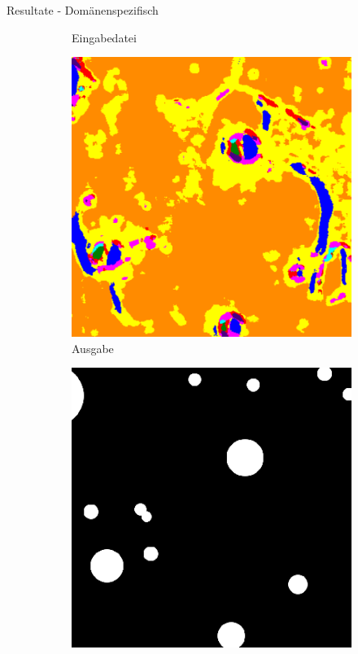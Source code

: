 \documentclass{beamer}
\begin{document}
\begin{frame}[allowframebreaks]{Resultate - Domänenspezifisch}
\begin{minipage}{0.38\textwidth}
\begin{figure}[h!]
\begin{subfigure}[t]{0.31\textwidth}
				\caption{Eingabedatei}
			\end{subfigure}
			\begin{subfigure}[t]{0.31\textwidth}
				\includegraphics[width=\linewidth,keepaspectratio]{gfx/rob_res/thm_dir_N-30_210.png_tile_160.png}
				\caption{Ausgabe}
			\end{subfigure}
			\begin{subfigure}[t]{0.31\textwidth}
				\includegraphics[width=\linewidth,keepaspectratio]{gfx/rob_hum/thm_dir_N-30_210.png_tile_160.png}

\end{subfigure}
\end{figure}
\end{minipage}
\end{frame}
\end{document}
